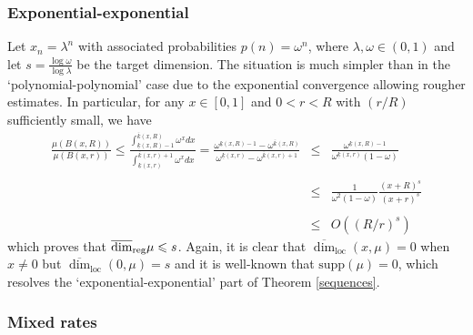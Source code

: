 \documentclass[12pt]{amsart}
\numberwithin{equation}{section}
\renewcommand{\le}{\leqslant}
\renewcommand{\leq}{\leqslant}
\renewcommand{\r}{\overline{\dim}_{\textup{reg}} \mu}
\begin{document}
\subsubsection{Exponential-exponential}



Let $ x_n = \lambda^{n} $ with associated probabilities $p(n)=\omega^{n}$, where $\lambda, \omega \in (0,1)$ and let $s=\frac{\log \omega}{\log \lambda}$ be the target dimension. The situation is much simpler than in the `polynomial-polynomial' case due to the exponential convergence allowing rougher estimates.  In particular, for any $x \in [0,1]$ and $0<r<R$ with $(r/R)$ sufficiently small, we have
\begin{eqnarray*}
\frac{\mu(B(x,R))}{\mu(B(x,r))} \le \frac{\int_{\underline{k}(x,R)-1}^{\overline{k}(x,R)} \omega^x dx}{\int_{\underline{k}(x,r)}^{\overline{k}(x,r)+1} \omega^x dx} = \frac{\omega^{\underline{k}(x,R)-1} - \omega^{\overline{k}(x,R)} }{\omega^{\underline{k}(x,r)}-\omega^{\overline{k}(x,r)+1}  }  &\le&  \frac{\omega^{\underline{k}(x,R)-1}   }{\omega^{\underline{k}(x,r)}(1-\omega)  } \\ \\
&  \le& \frac{1}{\omega^2(1-\omega)} \frac{(x+R)^s}{(x+r)^s} \\ \\
&  \le& O\left(  (R/r)^s \right)
\end{eqnarray*}
which proves that $\r \leq s$.  Again,  it is clear that $\overline{\dim}_{\text{loc}}(x,\mu)=0$ when $x\neq 0$ but $\overline{\dim}_{\text{loc}}(0,\mu)= s$ and it is well-known that $\text{supp}(\mu) = 0$, which resolves the `exponential-exponential' part of  Theorem \ref{sequences}.






\subsubsection{Mixed rates}
\end{document}
